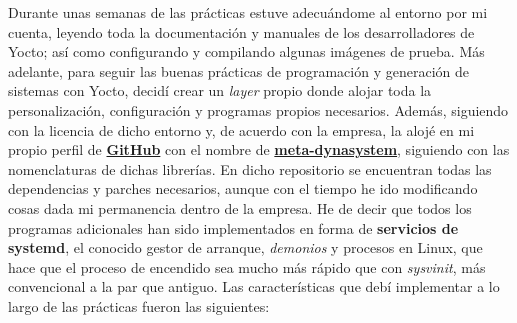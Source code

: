 \documentclass[13pt]{scrartcl}
\begin{document}
				Durante unas semanas de las prácticas estuve adecuándome al entorno por mi cuenta, leyendo toda la documentación y manuales de los desarrolladores de Yocto; así como configurando y compilando algunas imágenes de prueba. Más adelante, para seguir las buenas prácticas de programación y generación de sistemas con Yocto, decidí crear un \textit{layer} propio donde alojar toda la personalización, configuración y programas propios necesarios. Además, siguiendo con la licencia de dicho entorno y, de acuerdo con la empresa, la alojé en mi propio perfil de \href{https://github.com/adrianmorente}{\textbf{GitHub}} con el nombre de \href{https://github.com/adrianmorente/meta-dynasystem}{\textbf{meta-dynasystem}}, siguiendo con las nomenclaturas de dichas librerías. En dicho repositorio se encuentran todas las dependencias y parches necesarios, aunque con el tiempo he ido modificando cosas dada mi permanencia dentro de la empresa. He de decir que todos los programas adicionales han sido implementados en forma de \textbf{servicios de systemd}, el conocido gestor de arranque, \textit{demonios} y procesos en Linux, que hace que el proceso de encendido sea mucho más rápido que con \textit{sysvinit}, más convencional a la par que antiguo. Las características que debí implementar a lo largo de las prácticas fueron las siguientes:
\end{document}
